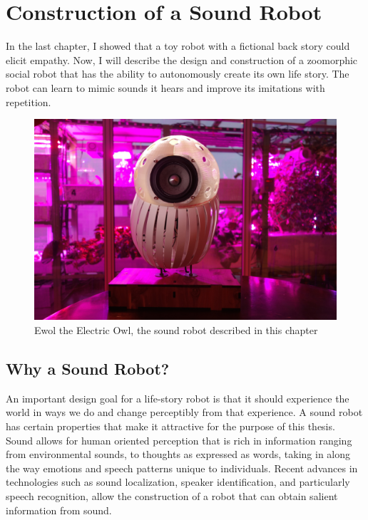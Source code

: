 \chapter{Construction of a Sound Robot}
\label{chap_design}

In the last chapter, I showed that a toy robot with a fictional back story could elicit empathy. Now, I will describe the design and construction of a zoomorphic social robot that has the ability to autonomously create its own life story. The robot can learn to mimic sounds it hears and improve its imitations with repetition. 



   \begin{figure}[thpb]
      \centering
      \includegraphics[width=4.6in]{figures/design/parrot_purple.JPG}
      \caption{Ewol the Electric Owl, the sound robot described in this chapter}
      \label{fig_parrot_purple}
   \end{figure}
   

\section{Why a Sound Robot?}

An important design goal for a life-story robot is that it should experience the world in ways we do and change perceptibly from that experience. A sound robot has certain properties that make it attractive for the purpose of this thesis.  Sound allows for human oriented perception that is rich in information ranging from environmental sounds, to thoughts as expressed as words, taking in along the way emotions and speech patterns unique to individuals. Recent advances in technologies such as sound localization, speaker identification, and particularly speech recognition, allow the construction of a robot that can obtain salient information from sound. 

